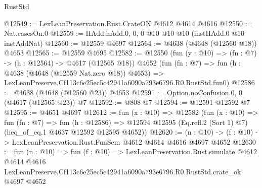\begin{lexlean}{RustStd}
\begin{coremodule}
@12549 := LexLeanPreservation.Rust.CrateOK @4612 @4614 @4616
@12550 := Nat.casesOn.{0}
@12559 := HAdd.hAdd.{0, 0, 0} @10 @10 @10 (instHAdd.{0} @10 instAddNat)
@12560 := @12559 @4697
@12564 := @4638 (@4648 (@12560 @18)) @4653
@12565 := @12559 @4695
@12582 := @12550
    (fun (y : @10) => (fn : @7) -> (h : @12564) -> @4617 (@12565 @18))
    @4652
    (fun (fn : @7) =>
    fun (h : @4638 (@4648 (@12559 Nat.zero @18)) @4653) =>
    LexLeanPreserve.Cf113c6e25ec5c42941a6090a793e6796.R0.RustStd.fun0)
@12586 := @4638 (@4648 (@12560 @23)) @4653
@12591 := Option.noConfusion.{0, 0} (@4617 (@12565 @23)) @7
@12592 := @808 @7
@12594 := @12591 @12592 @7
@12595 := @4651 @4697
@12612 := fun (x : @10) =>
  @12582
    (fun (x : @10) =>
    fun (fn : @7) =>
    fun (h : @12586) =>
    @12594 @12595 (Eq.refl.{2} (Sort 1) @7) (heq_of_eq.{1} @4637 @12592 @12595 @4652))
@12620 := (n : @10) -> (f : @10) -> LexLeanPreservation.Rust.FunSem @4612 @4614 @4616 @4697 @4652
@12630 := fun (n : @10) =>
  fun (f : @10) =>
  LexLeanPreservation.Rust.simulate
    @4612
    @4614
    @4616
    LexLeanPreserve.Cf113c6e25ec5c42941a6090a793e6796.R0.RustStd.crate_ok
    @4697
    @4652
\end{coremodule}
\end{lexlean}
